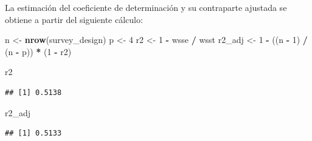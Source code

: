\documentclass[
  spanish,
  12pt,
]{book}
\newenvironment{Shaded}{\begin{snugshade}}{\end{snugshade}}
\newcommand{\AttributeTok}[1]{\textcolor[rgb]{0.13,0.29,0.53}{#1}}
\newcommand{\DecValTok}[1]{\textcolor[rgb]{0.00,0.00,0.81}{#1}}
\newcommand{\FunctionTok}[1]{\textcolor[rgb]{0.13,0.29,0.53}{\textbf{#1}}}
\newcommand{\NormalTok}[1]{#1}
\newcommand{\OtherTok}[1]{\textcolor[rgb]{0.56,0.35,0.01}{#1}}
\newcommand{\SpecialCharTok}[1]{\textcolor[rgb]{0.81,0.36,0.00}{\textbf{#1}}}
\begin{document}
\begin{Shaded}
\end{Shaded}

La estimación del coeficiente de determinación y su contraparte ajustada se obtiene a partir del siguiente cálculo:

\begin{Shaded}
\begin{Highlighting}[]
\NormalTok{n }\OtherTok{\textless{}{-}} \FunctionTok{nrow}\NormalTok{(survey\_design)}
\NormalTok{p }\OtherTok{\textless{}{-}} \DecValTok{4}
\NormalTok{r2 }\OtherTok{\textless{}{-}} \DecValTok{1} \SpecialCharTok{{-}}\NormalTok{ wsse }\SpecialCharTok{/}\NormalTok{ wsst}
\NormalTok{r2\_adj }\OtherTok{\textless{}{-}} \DecValTok{1} \SpecialCharTok{{-}}\NormalTok{ ((n }\SpecialCharTok{{-}} \DecValTok{1}\NormalTok{) }\SpecialCharTok{/}\NormalTok{ (n }\SpecialCharTok{{-}}\NormalTok{ p)) }\SpecialCharTok{*}\NormalTok{ (}\DecValTok{1} \SpecialCharTok{{-}}\NormalTok{ r2)}

\NormalTok{r2}
\end{Highlighting}
\end{Shaded}

\begin{verbatim}
## [1] 0.5138
\end{verbatim}

\begin{Shaded}
\begin{Highlighting}[]
\NormalTok{r2\_adj}
\end{Highlighting}
\end{Shaded}

\begin{verbatim}
## [1] 0.5133
\end{verbatim}
\end{document}
